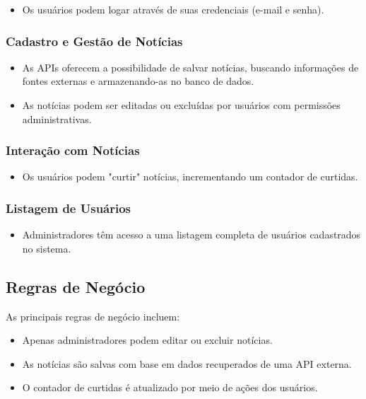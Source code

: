 \begin{itemize}
    \item Os usuários podem logar através de suas credenciais (e-mail e senha).
\end{itemize}

\subsubsection{Cadastro e Gestão de Notícias}
\begin{itemize}
    \item As APIs oferecem a possibilidade de salvar notícias, buscando informações de fontes externas e armazenando-as no banco de dados.
    \item As notícias podem ser editadas ou excluídas por usuários com permissões administrativas.
\end{itemize}

\subsubsection{Interação com Notícias}
\begin{itemize}
    \item Os usuários podem "curtir" notícias, incrementando um contador de curtidas.
\end{itemize}

\subsubsection{Listagem de Usuários}
\begin{itemize}
    \item Administradores têm acesso a uma listagem completa de usuários cadastrados no sistema.
\end{itemize}

\subsection{Regras de Negócio}
As principais regras de negócio incluem:
\begin{itemize}
    \item Apenas administradores podem editar ou excluir notícias.
    \item As notícias são salvas com base em dados recuperados de uma API externa.
    \item O contador de curtidas é atualizado por meio de ações dos usuários.
\end{itemize}

